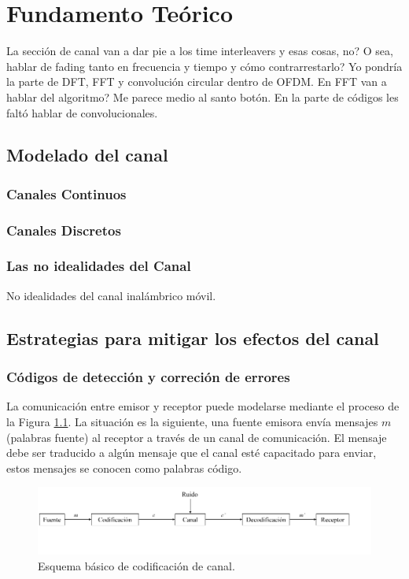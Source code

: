 \chapter{Fundamento Teórico}

La sección de canal van a dar pie a los time interleavers y esas cosas, no? O sea, hablar de fading tanto en frecuencia y tiempo y cómo contrarrestarlo?
Yo pondría la parte de DFT, FFT y convolución circular dentro de OFDM. En FFT van a hablar del algoritmo? Me parece medio al santo botón.
En la parte de códigos les faltó hablar de convolucionales.


\section{Modelado del canal}
	\subsection{Canales Continuos}
	\subsection{Canales Discretos}
	\subsection{Las no idealidades del Canal}
No idealidades del canal inalámbrico móvil.

\section{Estrategias para mitigar los efectos del canal}

	\subsection{C\'odigos de detecci\'on y correci\'on de errores}

La comunicación entre emisor y receptor puede modelarse mediante el proceso de la Figura \ref{diagrama_codificacion}. La situación es la siguiente, una fuente emisora envía mensajes $m$ (palabras fuente) al receptor a través de un canal de comunicación. El mensaje debe ser traducido a algún mensaje que el canal esté capacitado para enviar, estos mensajes se conocen como palabras código.

\begin{figure}
\centering
\includegraphics[scale=0.45]{figuras/cap02/diagrama_codificacion}
\caption{\label{diagrama_codificacion} Esquema básico de codificación de canal.}
\end{figure}

